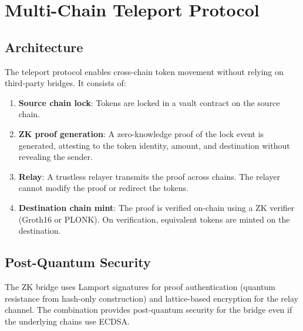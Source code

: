 \section{Multi-Chain Teleport Protocol}


\subsection{Architecture}

The teleport protocol enables cross-chain token movement without
relying on third-party bridges. It consists of:

\begin{enumerate}[nosep]
  \item \textbf{Source chain lock}: Tokens are locked in a vault
        contract on the source chain.
  \item \textbf{ZK proof generation}: A zero-knowledge proof of the
        lock event is generated, attesting to the token identity,
        amount, and destination without revealing the sender.
  \item \textbf{Relay}: A trustless relayer transmits the proof across
        chains. The relayer cannot modify the proof or redirect the
        tokens.
  \item \textbf{Destination chain mint}: The proof is verified
        on-chain using a ZK verifier (Groth16 or PLONK). On
        verification, equivalent tokens are minted on the destination.
\end{enumerate}

\subsection{Post-Quantum Security}

The ZK bridge uses Lamport signatures for proof authentication (quantum
resistance from hash-only construction) and lattice-based encryption
for the relay channel. The combination provides post-quantum security
for the bridge even if the underlying chains use ECDSA.

